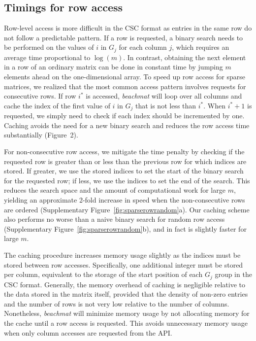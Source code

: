 \documentclass{article}
\newcommand{\beachmat}{\textit{beachmat}}
\begin{document}
\subsection{Timings for row access}
Row-level access is more difficult in the CSC format as entries in the same row do not follow a predictable pattern.
If a row is requested, a binary search needs to be performed on the values of $i$ in $G_j$ for each column $j$, which requires an average time proportional to $\log(m)$.
In contrast, obtaining the next element in a row of an ordinary matrix can be done in constant time by jumping $m$ elements ahead on the one-dimensional array.
To speed up row access for sparse matrices, we realized that the most common access pattern involves requests for consecutive rows.
If row $i^*$ is accessed, \beachmat{} will loop over all columns and cache the index of the first value of $i$ in $G_j$ that is not less than $i^*$.
When $i^*+1$ is requested, we simply need to check if each index should be incremented by one.
Caching avoids the need for a new binary search and reduces the row access time substantially (Figure~2).


For non-consecutive row access, we mitigate the time penalty by checking if the requested row is greater than or less than the previous row for which indices are stored.
If greater, we use the stored indices to set the start of the binary search for the requested row; if less, we use the indices to set the end of the search. 
This reduces the search space and the amount of computational work for large $m$, yielding an approximate 2-fold increase in speed when the non-consecutive rows are ordered (Supplementary Figure~\ref{fig:sparserowrandom}a).
Our caching scheme also performs no worse than a naive binary search for random row access (Supplementary Figure~\ref{fig:sparserowrandom}b), and in fact is slightly faster for large $m$.

The caching procedure increases memory usage slightly as the indices must be stored between row accesses.
Specifically, one additional integer must be stored per column, equivalent to the storage of the start position of each $G_j$ group in the CSC format.
Generally, the memory overhead of caching is negligible relative to the data stored in the matrix itself, provided that the density of non-zero entries and the number of rows is not very low relative to the number of columns.
Nonetheless, \beachmat{} will minimize memory usage by not allocating memory for the cache until a row access is requested.
This avoids unnecessary memory usage when only column accesses are requested from the API.
\end{document}
